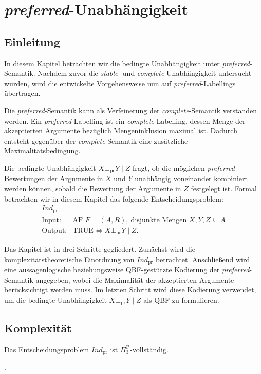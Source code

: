 \chapter{\textit{preferred}-Unabhängigkeit}
\label{ch:preferred}
\section{Einleitung}
\label{sec:pr-ci-einleitung}

In diesem Kapitel betrachten wir die bedingte Unabhängigkeit unter
\textit{preferred}-Semantik. Nachdem zuvor die \textit{stable}- und
\textit{complete}-Unabhängigkeit untersucht wurden, wird die entwickelte
Vorgehensweise nun auf \textit{preferred}-Labellings übertragen.

Die \textit{preferred}-Semantik kann als Verfeinerung der \textit{complete}-Semantik verstanden werden.
Ein \textit{preferred}-Labelling ist ein \textit{complete}-Labelling, dessen
Menge der akzeptierten Argumente bezüglich Mengeninklusion maximal ist. Dadurch
entsteht gegenüber der \textit{complete}-Semantik eine zusätzliche Maximalitätsbedingung.

Die bedingte Unabhängigkeit \( X \bot_{\mathrm{pr}} Y \mid Z\)
fragt, ob die möglichen \textit{preferred}-Bewertungen der Argumente in \(X\)
und \(Y\) unabhängig voneinander kombiniert werden können, sobald die Bewertung
der Argumente in \(Z\) festgelegt ist. 
Formal betrachten wir in diesem Kapitel das folgende Entscheidungsproblem:
\[
\begin{array}{ll}
\textit{Ind}_{\mathrm{pr}}\\
\text{Input:}  & \text{AF } F=(A,R),\ \text{disjunkte Mengen } X,Y,Z \subseteq A \\
\text{Output:} & \text{TRUE} \Longleftrightarrow X \bot_{\mathrm{pr}} Y \mid Z.
\end{array}
\]

Das Kapitel ist in drei Schritte gegliedert. Zunächst wird die
komplexitätstheoretische Einordnung von \(\textit{Ind}_{\mathrm{pr}}\)
betrachtet. Anschließend wird eine aussagenlogische beziehungsweise
QBF-gestützte Kodierung der \textit{preferred}-Semantik angegeben, wobei die
Maximalität der akzeptierten Argumente berücksichtigt werden muss. Im letzten
Schritt wird diese Kodierung verwendet, um die bedingte Unabhängigkeit
\(X \bot_{\mathrm{pr}} Y \mid Z\) als QBF zu formulieren.

\section{Komplexität}
\begin{Theorem}
    \label{th:ind-pr-is-pi3p-c}
    Das Entscheidungsproblem \(\textit{Ind}_{\mathrm{pr}}\) ist
    \(\Pi_3^\text{P}\)-vollständig.
\end{Theorem}
\textcite{bluemel:2025:independence-aba}.

